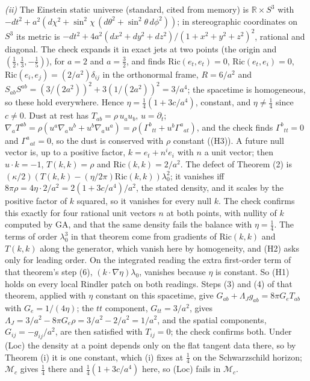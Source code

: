 \emph{(ii)} The Einstein static universe (standard, cited from memory) is $\mathbb{R}\times S^{3}$ with $-dt^{2} + a^{2}(d\chi^{2} + \sin^{2}\chi\,(d\theta^{2} + \sin^{2}\theta\,d\phi^{2}))$; in stereographic coordinates on $S^{3}$ its metric is $-dt^{2} + 4a^{2}(dx^{2} + dy^{2} + dz^{2})/(1 + x^{2} + y^{2} + z^{2})^{2}$, rational and diagonal. The check expands it in exact jets at two points (the origin and $(\tfrac12, \tfrac13, -\tfrac15)$), for $a = 2$ and $a = \tfrac32$, and finds $\mathrm{Ric}(e_{t}, e_{t}) = 0$, $\mathrm{Ric}(e_{t}, e_{i}) = 0$, $\mathrm{Ric}(e_{i}, e_{j}) = (2/a^{2})\delta_{ij}$ in the orthonormal frame, $R = 6/a^{2}$ and $S_{ab}S^{ab} = (3/(2a^{2}))^{2} + 3(1/(2a^{2}))^{2} = 3/a^{4}$; the spacetime is homogeneous, so these hold everywhere. Hence $\eta = \tfrac14(1 + 3c/a^{4})$, constant, and $\eta \neq \tfrac14$ since $c \neq 0$. Dust at rest has $T_{ab} = \rho\,u_{a}u_{b}$, $u = \partial_{t}$; $\nabla_{a}T^{ab} = \rho(u^{a}\nabla_{a}u^{b} + u^{b}\nabla_{a}u^{a}) = \rho(\Gamma^{b}{}_{tt} + u^{b}\Gamma^{a}{}_{at})$, and the check finds $\Gamma^{b}{}_{tt} = 0$ and $\Gamma^{a}{}_{at} = 0$, so the dust is conserved with $\rho$ constant ((H3)). A future null vector is, up to a positive factor, $k = e_{t} + n^{i}e_{i}$ with $n$ a unit vector; then $u\cdot k = -1$, $T(k,k) = \rho$ and $\mathrm{Ric}(k,k) = 2/a^{2}$. The defect of Theorem (2) is $(\kappa/2)(T(k,k) - (\eta/2\pi)\mathrm{Ric}(k,k))\lambda_{0}^{2}$; it vanishes iff $8\pi\rho = 4\eta\cdot 2/a^{2} = 2(1 + 3c/a^{4})/a^{2}$, the stated density, and it scales by the positive factor of $k$ squared, so it vanishes for every null $k$. The check confirms this exactly for four rational unit vectors $n$ at both points, with nullity of $k$ computed by GA, and that the same density fails the balance with $\eta = \tfrac14$. The terms of order $\lambda_{0}^{3}$ in that theorem come from gradients of $\mathrm{Ric}(k,k)$ and $T(k,k)$ along the generator, which vanish here by homogeneity, and (H2) asks only for leading order. On the integrated reading the extra first-order term of that theorem's step (6), $(k\cdot\nabla\eta)\lambda_{0}$, vanishes because $\eta$ is constant. So (H1) holds on every local Rindler patch on both readings. Steps (3) and (4) of that theorem, applied with $\eta$ constant on this spacetime, give $G_{ab} + \Lambda_{J}g_{ab} = 8\pi G_{e}T_{ab}$ with $G_{e} = 1/(4\eta)$; the $tt$ component, $G_{tt} = 3/a^{2}$, gives $\Lambda_{J} = 3/a^{2} - 8\pi G_{e}\rho = 3/a^{2} - 2/a^{2} = 1/a^{2}$, and the spatial components, $G_{ij} = -g_{ij}/a^{2}$, are then satisfied with $T_{ij} = 0$; the check confirms both. Under (Loc) the density at a point depends only on the flat tangent data there, so by Theorem (i) it is one constant, which (i) fixes at $\tfrac14$ on the Schwarzschild horizon; $\mathcal{M}_{c}$ gives $\tfrac14$ there and $\tfrac14(1 + 3c/a^{4})$ here, so (Loc) fails in $\mathcal{M}_{c}$.

